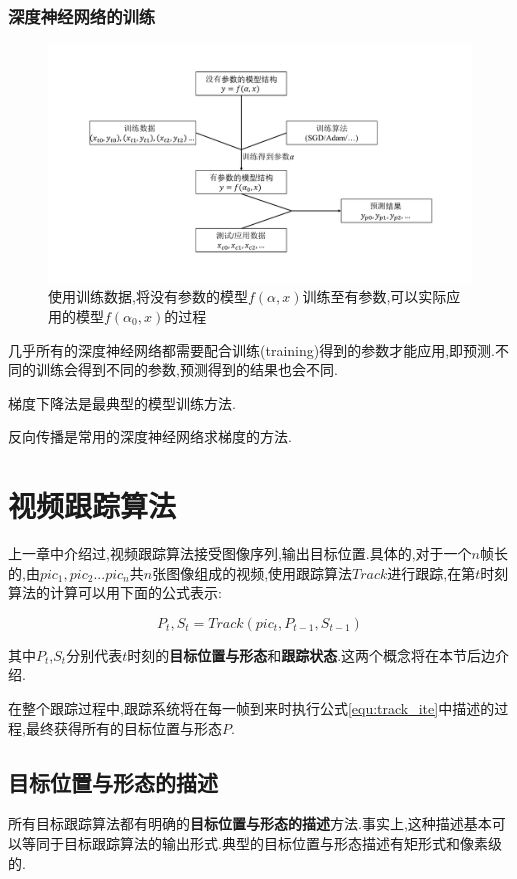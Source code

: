 \subsubsection{深度神经网络的训练}
\par
\begin{figure}[htbp!]
    \centering
    \includegraphics[width = 1.\textwidth]{chap/img/model_learning.pdf}
    \caption{使用训练数据,将没有参数的模型$f(\alpha,x)$训练至有参数,可以实际应用的模型$f(\alpha_0,x)$的过程}
    \label{fig:model_learning}
\end{figure}
几乎所有的深度神经网络都需要配合训练(training)得到的参数才能应用,即预测.不同的训练会得到不同的参数,预测得到的结果也会不同.
\par
梯度下降法是最典型的模型训练方法.
\par
反向传播是常用的深度神经网络求梯度的方法.

\section{视频跟踪算法}
上一章中介绍过,视频跟踪算法接受图像序列,输出目标位置.具体的,对于一个$n$帧长的,由$pic_1,pic_2...pic_n$共$n$张图像组成的视频,使用跟踪算法$Track$进行跟踪,在第$t$时刻算法的计算可以用下面的公式表示:
\par
\begin{equation}\label{equ:track_ite}  P_t,S_t=Track(pic_{t},P_{t-1},S_{t-1})  \end{equation}
\par
其中$P_t$,$S_t$分别代表$t$时刻的\textbf{目标位置与形态}和\textbf{跟踪状态}.这两个概念将在本节后边介绍.
\par
在整个跟踪过程中,跟踪系统将在每一帧到来时执行公式\ref{equ:track_ite}中描述的过程,最终获得所有的目标位置与形态$P$.
\par
\subsection{目标位置与形态的描述} 
所有目标跟踪算法都有明确的\textbf{目标位置与形态的描述}方法.事实上,这种描述基本可以等同于目标跟踪算法的输出形式.典型的目标位置与形态描述有矩形式和像素级的.
\par
